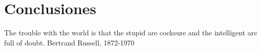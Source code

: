 \chapter{Conclusiones}
\label{conclusiones}
\chapterquote
{The trouble with the world is that the stupid are cocksure and the intelligent are full of doubt.}
{Bertrand Russell, 1872-1970}
